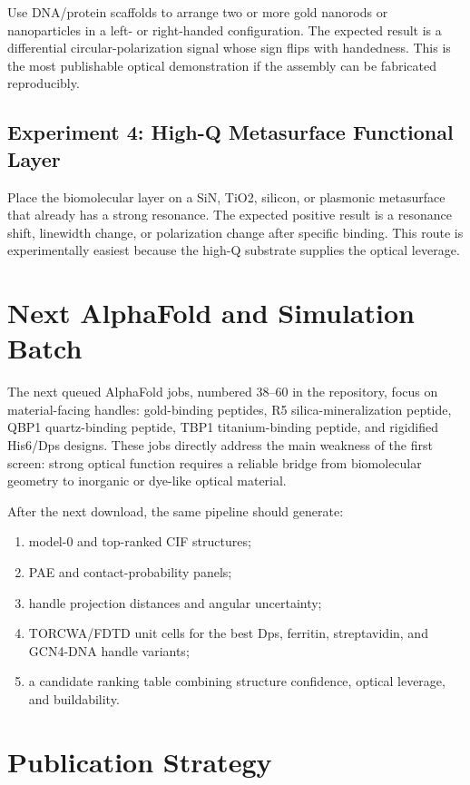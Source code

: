 \documentclass[11pt]{article}
\newcommand{\af}{AlphaFold}
\begin{document}
Use DNA/protein scaffolds to arrange two or more gold nanorods or nanoparticles in a left- or right-handed configuration. The expected result is a differential circular-polarization signal whose sign flips with handedness. This is the most publishable optical demonstration if the assembly can be fabricated reproducibly.

\subsection{Experiment 4: High-Q Metasurface Functional Layer}

Place the biomolecular layer on a SiN, TiO2, silicon, or plasmonic metasurface that already has a strong resonance. The expected positive result is a resonance shift, linewidth change, or polarization change after specific binding. This route is experimentally easiest because the high-Q substrate supplies the optical leverage.

\section{Next AlphaFold and Simulation Batch}

The next queued \af{} jobs, numbered 38--60 in the repository, focus on material-facing handles: gold-binding peptides, R5 silica-mineralization peptide, QBP1 quartz-binding peptide, TBP1 titanium-binding peptide, and rigidified His6/Dps designs. These jobs directly address the main weakness of the first screen: strong optical function requires a reliable bridge from biomolecular geometry to inorganic or dye-like optical material.

After the next download, the same pipeline should generate:

\begin{enumerate}
\item model-0 and top-ranked CIF structures;
\item PAE and contact-probability panels;
\item handle projection distances and angular uncertainty;
\item TORCWA/FDTD unit cells for the best Dps, ferritin, streptavidin, and GCN4-DNA handle variants;
\item a candidate ranking table combining structure confidence, optical leverage, and buildability.
\end{enumerate}

\section{Publication Strategy}
\end{document}
